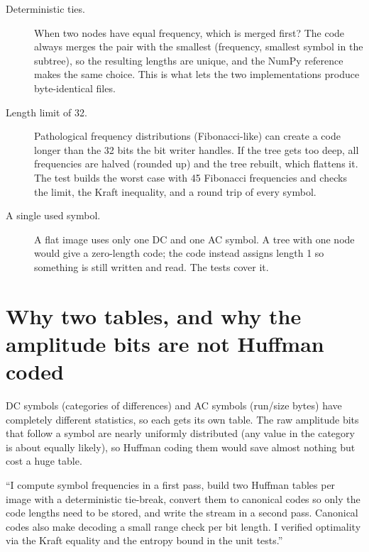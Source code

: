 \begin{description}
\item[Deterministic ties.] When two nodes have equal frequency, which is merged first? The code always merges the pair with the smallest (frequency, smallest symbol in the subtree), so the resulting lengths are unique, and the NumPy reference makes the same choice. This is what lets the two implementations produce byte-identical files.

\item[Length limit of 32.] Pathological frequency distributions (Fibonacci-like) can create a code longer than the 32 bits the bit writer handles. If the tree gets too deep, all frequencies are halved (rounded up) and the tree rebuilt, which flattens it. The test  builds the worst case with 45 Fibonacci frequencies and checks the limit, the Kraft inequality, and a round trip of every symbol.
\item[A single used symbol.] A flat image uses only one DC and one AC symbol. A tree with one node would give a zero-length code; the code instead assigns length 1 so something is still written and read. The tests cover it.
\end{description}

\section{Why two tables, and why the amplitude bits are not Huffman coded}

DC symbols (categories of differences) and AC symbols (run/size bytes) have completely different statistics, so each gets its own table. The raw amplitude bits that follow a symbol are nearly uniformly distributed (any value in the category is about equally likely), so Huffman coding them would save almost nothing but cost a huge table.

\begin{sound}
``I compute symbol frequencies in a first pass, build two Huffman tables per image with a deterministic tie-break, convert them to canonical codes so only the code lengths need to be stored, and write the stream in a second pass. Canonical codes also make decoding a small range check per bit length. I verified optimality via the Kraft equality and the entropy bound in the unit tests.''
\end{sound}
